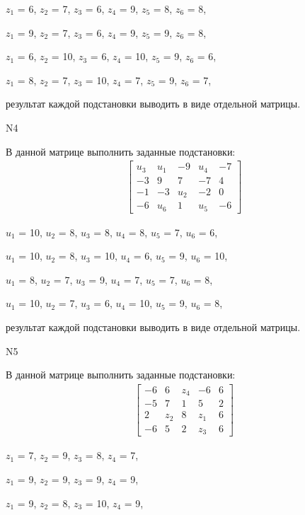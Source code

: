 \documentclass[11pt]{report}
\begin{document}
$z_{1}$ = 6, $z_{2}$ = 7, $z_{3}$ = 6, $z_{4}$ = 9, $z_{5}$ = 8, $z_{6}$ = 8, 

$z_{1}$ = 9, $z_{2}$ = 7, $z_{3}$ = 6, $z_{4}$ = 9, $z_{5}$ = 9, $z_{6}$ = 8, 

$z_{1}$ = 6, $z_{2}$ = 10, $z_{3}$ = 6, $z_{4}$ = 10, $z_{5}$ = 9, $z_{6}$ = 6, 

$z_{1}$ = 8, $z_{2}$ = 7, $z_{3}$ = 10, $z_{4}$ = 7, $z_{5}$ = 9, $z_{6}$ = 7, 

результат каждой подстановки выводить в виде отдельной матрицы.

N4

В данной матрице выполнить заданные подстановки:
\begin{align*}
\left[\begin{matrix}u_{3} & u_{1} & -9 & u_{4} & -7\\-3 & 9 & 7 & -7 & 4\\-1 & -3 & u_{2} & -2 & 0\\-6 & u_{6} & 1 & u_{5} & -6\end{matrix}\right]
\end{align*}


$u_{1}$ = 10, $u_{2}$ = 8, $u_{3}$ = 8, $u_{4}$ = 8, $u_{5}$ = 7, $u_{6}$ = 6, 

$u_{1}$ = 10, $u_{2}$ = 8, $u_{3}$ = 10, $u_{4}$ = 6, $u_{5}$ = 9, $u_{6}$ = 10, 

$u_{1}$ = 8, $u_{2}$ = 7, $u_{3}$ = 9, $u_{4}$ = 7, $u_{5}$ = 7, $u_{6}$ = 8, 

$u_{1}$ = 10, $u_{2}$ = 7, $u_{3}$ = 6, $u_{4}$ = 10, $u_{5}$ = 9, $u_{6}$ = 8, 

результат каждой подстановки выводить в виде отдельной матрицы.

N5

В данной матрице выполнить заданные подстановки:
\begin{align*}
\left[\begin{matrix}-6 & 6 & z_{4} & -6 & 6\\-5 & 7 & 1 & 5 & 2\\2 & z_{2} & 8 & z_{1} & 6\\-6 & 5 & 2 & z_{3} & 6\end{matrix}\right]
\end{align*}


$z_{1}$ = 7, $z_{2}$ = 9, $z_{3}$ = 8, $z_{4}$ = 7, 

$z_{1}$ = 9, $z_{2}$ = 9, $z_{3}$ = 9, $z_{4}$ = 9, 

$z_{1}$ = 9, $z_{2}$ = 8, $z_{3}$ = 10, $z_{4}$ = 9, 
\end{document}
